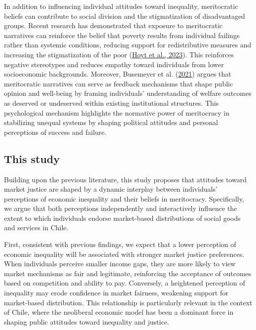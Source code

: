 \documentclass[
  12pt,
]{article}
\begin{document}
In addition to influencing individual attitudes toward inequality,
meritocratic beliefs can contribute to social division and the
stigmatization of disadvantaged groups. Recent research has demonstrated
that exposure to meritocratic narratives can reinforce the belief that
poverty results from individual failings rather than systemic
conditions, reducing support for redistributive measures and increasing
the stigmatization of the poor
(\protect\hyperlink{ref-hoyt_mindsets_2023}{Hoyt et al., 2023}). This
reinforces negative stereotypes and reduces empathy toward individuals
from lower socioeconomic backgrounds. Moreover, Busemeyer et al.
(\protect\hyperlink{ref-busemeyer_positive_2021}{2021}) argues that
meritocratic narratives can serve as feedback mechanisms that shape
public opinion and well-being by framing individuals' understanding of
welfare outcomes as deserved or undeserved within existing institutional
structures. This psychological mechanism highlights the normative power
of meritocracy in stabilizing unequal systems by shaping political
attitudes and personal perceptions of success and failure.

\hypertarget{this-study}{%
\subsection{This study}\label{this-study}}

Building upon the previous literature, this study proposes that
attitudes toward market justice are shaped by a dynamic interplay
between individuals' perceptions of economic inequality and their
beliefs in meritocracy. Specifically, we argue that both perceptions
independently and interactively influence the extent to which
individuals endorse market-based distributions of social goods and
services in Chile.

First, consistent with previous findings, we expect that a lower
perception of economic inequality will be associated with stronger
market justice preferences. When individuals perceive smaller income
gaps, they are more likely to view market mechanisms as fair and
legitimate, reinforcing the acceptance of outcomes based on competition
and ability to pay. Conversely, a heightened perception of inequality
may erode confidence in market fairness, weakening support for
market-based distribution. This relationship is particularly relevant in
the context of Chile, where the neoliberal economic model has been a
dominant force in shaping public attitudes toward inequality and
justice.
\end{document}
